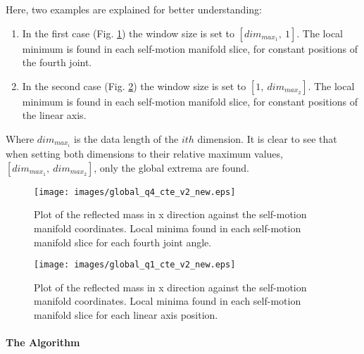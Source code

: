 Here, two examples are explained for better understanding:
\begin{enumerate}
	\item In the first case (Fig. \ref{fig:maxminfilter1}) the window size is set to $[dim_{max_{1}}, \ 1]$. The local minimum is found in each self-motion manifold slice, for constant positions of the fourth joint.
	\item In the second case (Fig. \ref{fig:maxminfilter2}) the window size is set to $[1, \ dim_{max_{2}}]$. The local minimum is found in each self-motion manifold slice, for constant positions of the linear axis.
	
\end{enumerate}

Where $dim_{max_{i}}$ is the data length of the $ith$ dimension. It is clear to see that when setting both dimensions to their relative maximum values, $[dim_{max_{1}}, \ dim_{max_{2}}]$, only the global extrema are found.


\begin{figure}[htb]
	\centerline{
		\texttt{[image: images/global\_q4\_cte\_v2\_new.eps]}}
	\caption{Plot of the reflected mass in x direction against the self-motion
		manifold coordinates. Local minima found in each self-motion manifold slice for each fourth joint angle. }
	\label{fig:maxminfilter1}
\end{figure}

\begin{figure}[htb]
	\centerline{
 		\texttt{[image: images/global\_q1\_cte\_v2\_new.eps]}}
	\caption{ Plot of the reflected mass in x direction against the self-motion
		manifold coordinates. Local minima found in each self-motion manifold slice for each linear axis position. }
	\label{fig:maxminfilter2}
\end{figure}





\paragraph{The Algorithm}
\label{subsec:global_alg}


